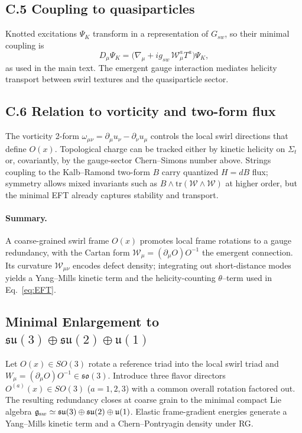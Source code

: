 \documentclass[11pt, preprint,titlepage]{revtex4-2}
\begin{document}
		\subsection*{C.5 Coupling to quasiparticles}
		Knotted excitations \(\Psi_K\) transform in a representation of \(G_{\!sw}\), so their minimal coupling is
		\[
		D_\mu\Psi_K=\big(\nabla_\mu + i g_{\!sw}\,\mathcal{W}_\mu^a T^a\big)\Psi_K,
		\]
		as used in the main text. The emergent gauge interaction mediates helicity transport between swirl textures and the quasiparticle sector.

		\subsection*{C.6 Relation to vorticity and two-form flux}
		The vorticity 2-form \(\omega_{\mu\nu}=\partial_\mu u_\nu-\partial_\nu u_\mu\) controls the local swirl directions that define \(O(x)\).
		Topological charge can be tracked either by kinetic helicity on \(\Sigma_t\) or, covariantly, by the gauge-sector Chern–Simons number above. Strings coupling to the Kalb–Ramond two-form \(B\) carry quantized \(H=dB\) flux; symmetry allows mixed invariants such as \(B\wedge\mathrm{tr}(\mathcal{W}\wedge\mathcal{W})\) at higher order, but the minimal EFT already captures stability and transport.

		\paragraph{Summary.}
		A coarse-grained swirl frame \(O(x)\) promotes local frame rotations to a gauge redundancy, with the Cartan form \(\mathcal{W}_\mu=(\partial_\mu O)O^{-1}\) the emergent connection. Its curvature \(\mathcal{W}_{\mu\nu}\) encodes defect density; integrating out short-distance modes yields a Yang–Mills kinetic term and the helicity-counting \(\theta\)–term used in Eq.~\eqref{eq:EFT}.

		\subsection{Minimal Enlargement to \texorpdfstring{$\mathfrak{su}(3)\oplus\mathfrak{su}(2)\oplus\mathfrak u(1)$}{su(3)+su(2)+u(1)}}
		Let \(O(x)\in SO(3)\) rotate a reference triad into the local swirl triad and \(W_\mu=(\partial_\mu O)O^{-1}\in\mathfrak{so}(3)\).
		Introduce three flavor directors \(O^{(a)}(x)\in SO(3)\) (\(a=1,2,3\)) with a common overall rotation factored out.
		The resulting redundancy closes at coarse grain to the minimal compact Lie algebra
		\(\mathfrak g_{\textrm sw}\simeq \mathfrak{su}(3)\oplus\mathfrak{su}(2)\oplus\mathfrak u(1)\).
		Elastic frame-gradient energies generate a Yang--Mills kinetic term and a Chern--Pontryagin density under RG.
\end{document}
